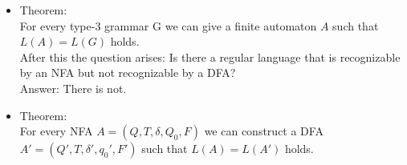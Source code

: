 \documentclass[margin=0px]{article}
\begin{document}
\begin{description}
\begin{itemize}
            \item Theorem: \\
                  For every type-3 grammar G we can give a finite automaton $A$ such that $L(A) = L(G)$ holds. \\


                  After this the question arises: Is there a regular language that is recognizable by an NFA but not recognizable by a DFA? \\
                  Answer: There is not.

            \item Theorem:\\
                  For every NFA $A = (Q, T, \delta,Q_0, F)$ we can construct a DFA $A' = (Q', T, \delta', q_0', F')$ such that $L(A) = L(A')$ holds.
        \end{itemize}
\end{description}
\end{document}
